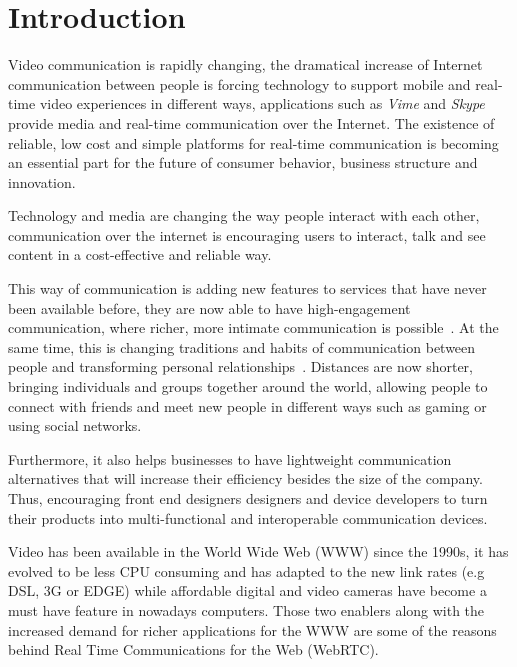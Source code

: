 \section{Introduction}

\thispagestyle{empty}

Video communication is rapidly changing, the dramatical increase of Internet communication between people is forcing technology to support mobile and real-time video experiences in different ways, applications such as {\it Vime} and {\it Skype} provide media and real-time communication over the Internet. The existence of reliable, low cost and simple platforms for real-time communication is becoming an essential part for the future of consumer behavior, business structure and innovation.

Technology and media are changing the way people interact with each other, communication over the internet is encouraging users to interact, talk and see content in a cost-effective and reliable way. 

This way of communication is adding new features to services that have never been available before, they are now able to have high-engagement communication, where richer, more intimate communication is possible~\cite{futureRTC}. At the same time, this is changing traditions and habits of communication between people and transforming personal relationships~\cite{socialrelationships}. Distances are now shorter, bringing individuals and groups together around the world, allowing people to connect with friends and meet new people in different ways such as gaming or using social networks.

Furthermore, it also helps businesses to have lightweight communication alternatives that will increase their efficiency besides the size of the company. Thus, encouraging front end designers designers and device developers to turn their products into multi-functional and interoperable communication devices.

Video has been available in the World Wide Web (WWW) since the 1990s, it has evolved to be less CPU consuming and has adapted to the new link rates (e.g DSL, 3G or EDGE) while affordable digital and video cameras have become a must have feature in nowadays computers. Those two enablers along with the increased demand for richer applications for the WWW are some of the reasons behind Real Time Communications for the Web (WebRTC).

